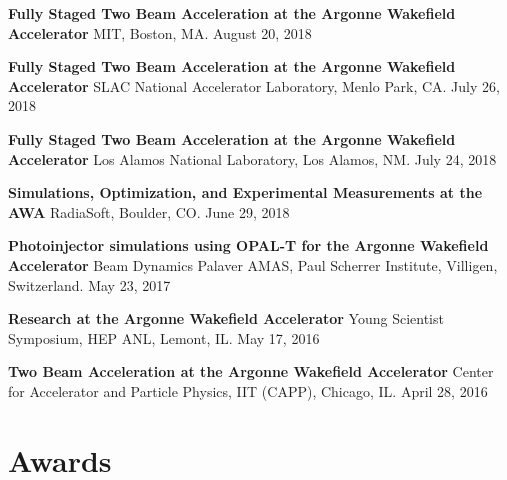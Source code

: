 \documentclass[11pt,a4paper,sans]{moderncv}        %
\begin{document}
\textbf{Fully Staged Two Beam Acceleration at the Argonne Wakefield Accelerator}\newline
MIT, Boston, MA. August 20, 2018 
\vspace{0.3em}

\textbf{Fully Staged Two Beam Acceleration at the Argonne Wakefield Accelerator}\newline
SLAC National Accelerator Laboratory, Menlo Park, CA. July 26, 2018 
\vspace{0.3em}

\textbf{Fully Staged Two Beam Acceleration at the Argonne Wakefield Accelerator}\newline
Los Alamos National Laboratory, Los Alamos, NM. July 24, 2018 
\vspace{0.3em}

\textbf{Simulations, Optimization, and Experimental Measurements at the AWA}\newline
RadiaSoft, Boulder, CO. June 29, 2018 
\vspace{0.3em}

\textbf{Photoinjector simulations using OPAL-T for the Argonne Wakefield Accelerator}\newline
Beam Dynamics Palaver AMAS, Paul Scherrer Institute, Villigen, Switzerland. May 23, 2017 
\vspace{0.3em}

\textbf{Research at the Argonne Wakefield Accelerator}\newline
Young Scientist Symposium, HEP ANL, Lemont, IL. May 17, 2016 
\vspace{0.3em}

\textbf{Two Beam Acceleration at the Argonne Wakefield Accelerator}\newline
Center for Accelerator and Particle Physics, IIT (CAPP), Chicago, IL. April 28, 2016 

\section{Awards}

\end{document}
